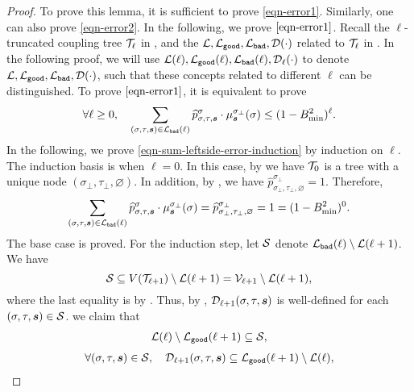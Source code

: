 \documentclass[11pt]{article}
\def\!#1{\mathtt{#1}}
\newcommand{\seqS}{\boldsymbol{s}}
\begin{document}
\begin{proof}
To prove this lemma, it is sufficient to prove \eqref{eqn-error1}.
Similarly, one can also prove \eqref{eqn-error2}.
In the following, we prove $\eqref{eqn-error1}$.
Recall the $\ell$-truncated coupling tree $\mathcal{T}_{\ell}$ in , 
and the $\+L,\+L_{\!{good}},\+L_{\!{bad}},\+D(\cdot)$ related to $\mathcal{T}_{\ell}$ in .
In the following proof, we will use $\+L(\ell),\+L_{\!{good}}(\ell),\+L_{\!{bad}}(\ell),\+D_{\ell}(\cdot)$ to denote $\+L,\+L_{\!{good}},\+L_{\!{bad}},\+D(\cdot)$, such that
these concepts related to different $\ell$ can be distinguished.
To prove $\eqref{eqn-error1}$,
it is equivalent to prove
\begin{align}\label{eqn-sum-leftside-error-induction}
    \forall \ell\geq 0, \quad \sum_{(\sigma,\tau, \seqS)\in \+L_{\!{bad}}(\ell)} \widehat{p}^{\sigma}_{\sigma,\tau,\seqS} \cdot \mu^{\sigma_{\bot}}_{\seqS}(\sigma)\leq (1 - B_{\min}^2)^{\ell}.
\end{align}
In the following, we prove \eqref{eqn-sum-leftside-error-induction} by induction on $\ell$.
The induction basis is when $\ell = 0$.
In this case, by  we have $\mathcal{T}_{0}$ is a tree with a unique node $(\sigma_\bot, \tau_\bot, \varnothing)$.
In addition, by , we have 
$\widehat{p}^{\sigma_\bot}_{\sigma_\bot,\tau_\bot, \varnothing} = 1$.
Therefore, 
 \begin{align*}
    \sum_{(\sigma,\tau, \seqS)\in \+L_{\!{bad}}(\ell)} \widehat{p}^{\sigma}_{\sigma,\tau,\seqS}\cdot\mu^{\sigma_{\bot}}_{\seqS}(\sigma)=\widehat{p}^{\sigma_\bot}_{\sigma_\bot,\tau_\bot, \varnothing} = 1 = (1- B_{\min}^2)^{0}.
\end{align*}
The base case is proved. For the induction step, 
let $\mathcal{S}$ denote $\+L_{\!{bad}}(\ell)\setminus \+L(\ell+1)$.
We have 
\[\mathcal{S} \subseteq V(\mathcal{T}_{\ell+1})\setminus \mathcal{L}(\ell+1)= \mathcal{V}_{\ell+1}\setminus \mathcal{L}(\ell+1),\]
where the last equality is by .
Thus, by , 
$\+D_{\ell+1}(\sigma,\tau,\seqS)$ is well-defined for each $(\sigma,\tau,\seqS)\in \+S$.
we claim that 
\begin{align}\label{eq-d-subset-1}
\+L(\ell)\setminus \+L_{\!{good}}(\ell+1) \subseteq \+S,
\end{align}
\begin{align}\label{eq-d-subset-2}
\forall (\sigma,\tau,\seqS)\in \+S, \quad \+D_{\ell+1}(\sigma,\tau,\seqS)\subseteq \+L_{\!{good}}(\ell+1)\setminus \+L(\ell),

\end{align}
\end{proof}
\end{document}
